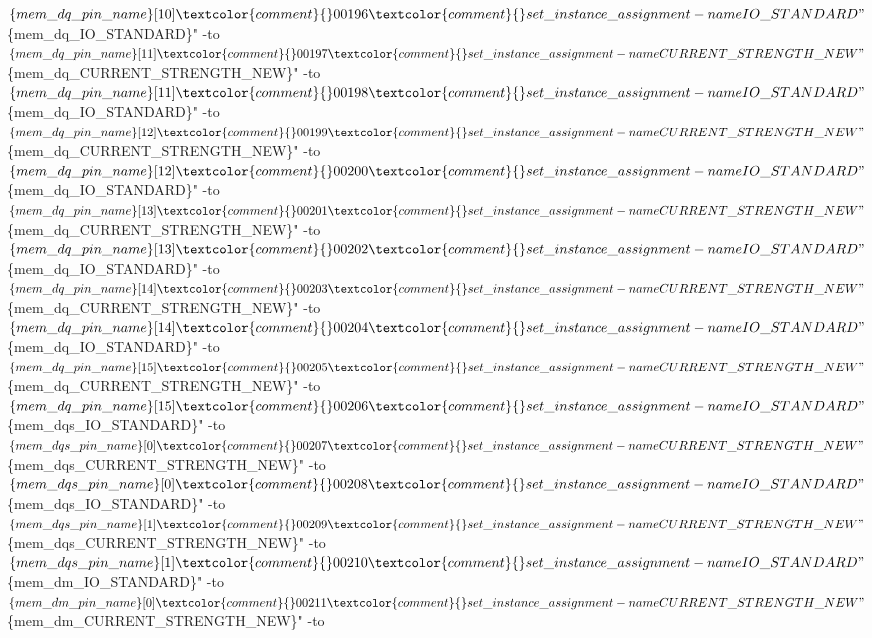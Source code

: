 \begin{DoxyCode}
      $\{mem\_dq\_pin\_name\}[10]\textcolor{comment}{}
00196 \textcolor{comment}{}set\_instance\_assignment -name IO\_STANDARD "$\{mem\_dq\_IO\_STANDARD\}" -to $\{mem\_dq\_pin\_name\}[11]\textcolor{comment}{}
00197 \textcolor{comment}{}set\_instance\_assignment -name CURRENT\_STRENGTH\_NEW "$\{mem\_dq\_CURRENT\_STRENGTH\_NEW\}" -to 
      $\{mem\_dq\_pin\_name\}[11]\textcolor{comment}{}
00198 \textcolor{comment}{}set\_instance\_assignment -name IO\_STANDARD "$\{mem\_dq\_IO\_STANDARD\}" -to $\{mem\_dq\_pin\_name\}[12]\textcolor{comment}{}
00199 \textcolor{comment}{}set\_instance\_assignment -name CURRENT\_STRENGTH\_NEW "$\{mem\_dq\_CURRENT\_STRENGTH\_NEW\}" -to 
      $\{mem\_dq\_pin\_name\}[12]\textcolor{comment}{}
00200 \textcolor{comment}{}set\_instance\_assignment -name IO\_STANDARD "$\{mem\_dq\_IO\_STANDARD\}" -to $\{mem\_dq\_pin\_name\}[13]\textcolor{comment}{}
00201 \textcolor{comment}{}set\_instance\_assignment -name CURRENT\_STRENGTH\_NEW "$\{mem\_dq\_CURRENT\_STRENGTH\_NEW\}" -to 
      $\{mem\_dq\_pin\_name\}[13]\textcolor{comment}{}
00202 \textcolor{comment}{}set\_instance\_assignment -name IO\_STANDARD "$\{mem\_dq\_IO\_STANDARD\}" -to $\{mem\_dq\_pin\_name\}[14]\textcolor{comment}{}
00203 \textcolor{comment}{}set\_instance\_assignment -name CURRENT\_STRENGTH\_NEW "$\{mem\_dq\_CURRENT\_STRENGTH\_NEW\}" -to 
      $\{mem\_dq\_pin\_name\}[14]\textcolor{comment}{}
00204 \textcolor{comment}{}set\_instance\_assignment -name IO\_STANDARD "$\{mem\_dq\_IO\_STANDARD\}" -to $\{mem\_dq\_pin\_name\}[15]\textcolor{comment}{}
00205 \textcolor{comment}{}set\_instance\_assignment -name CURRENT\_STRENGTH\_NEW "$\{mem\_dq\_CURRENT\_STRENGTH\_NEW\}" -to 
      $\{mem\_dq\_pin\_name\}[15]\textcolor{comment}{}
00206 \textcolor{comment}{}set\_instance\_assignment -name IO\_STANDARD "$\{mem\_dqs\_IO\_STANDARD\}" -to $\{mem\_dqs\_pin\_name\}[0]\textcolor{comment}{}
00207 \textcolor{comment}{}set\_instance\_assignment -name CURRENT\_STRENGTH\_NEW "$\{mem\_dqs\_CURRENT\_STRENGTH\_NEW\}" -to 
      $\{mem\_dqs\_pin\_name\}[0]\textcolor{comment}{}
00208 \textcolor{comment}{}set\_instance\_assignment -name IO\_STANDARD "$\{mem\_dqs\_IO\_STANDARD\}" -to $\{mem\_dqs\_pin\_name\}[1]\textcolor{comment}{}
00209 \textcolor{comment}{}set\_instance\_assignment -name CURRENT\_STRENGTH\_NEW "$\{mem\_dqs\_CURRENT\_STRENGTH\_NEW\}" -to 
      $\{mem\_dqs\_pin\_name\}[1]\textcolor{comment}{}
00210 \textcolor{comment}{}set\_instance\_assignment -name IO\_STANDARD "$\{mem\_dm\_IO\_STANDARD\}" -to $\{mem\_dm\_pin\_name\}[0]\textcolor{comment}{}
00211 \textcolor{comment}{}set\_instance\_assignment -name CURRENT\_STRENGTH\_NEW "$\{mem\_dm\_CURRENT\_STRENGTH\_NEW\}" -to 

\end{DoxyCode}

